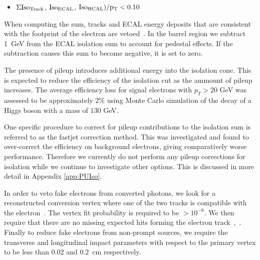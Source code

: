 \begin{itemize}
    \item $\Sigma \rm{Iso}_{Track}$, $\rm{Iso}_{ECAL}$, $\rm{Iso}_{HCAL}) / p_T < 0.10$
\end{itemize}

When computing the sum, tracks and ECAL energy deposits that are consistent 
with the footprint of the electron are vetoed~\cite{ElIso}.
In the barrel region we subtract 1~GeV from the ECAL isolation sum to account for pedestal effects.
If the subtraction causes this sum to become negative, it is set to zero.

The presence of pileup introduces additional energy into the isolation cone.
This is expected to reduce the efficiency of the isolation cut as the ammount of 
pileup increases.
The average efficiency loss for signal electrons with $p_{T} > 20$ GeV 
was assessed to be approximately $2\%$ using Monte Carlo simulation of the decay
of a Higgs boson with a mass of $130$ GeV.

One specific procedure to correct for pileup contributions to the
isolation sum is referred to as the fastjet correction method.
This was investigated and found to over-correct the efficiency on background electrons,
giving comparatively worse performance.
Therefore we currently do not perform any pileup corrections for isolation while
we continue to investigate other options.
This is discussed in more detail in Appendix \ref{app:PUIso}.

In order to veto fake electrons from converted photons, 
we look for a reconstructed conversion vertex where one of the two tracks 
is compatible with the electron~\cite{ConversionNote}.
The vertex fit probability is required to be $>10^{-6}$.
We then require that there are no missing expected hits forming the electron track~\cite{ConversionNote},~\cite{NExpHits}. 
Finally to reduce fake electrons from non-prompt sources,
we require the transverse and longitudinal impact parameters with
respect to the primary vertex to be less than $0.02$ and $0.2$~cm respectively.

